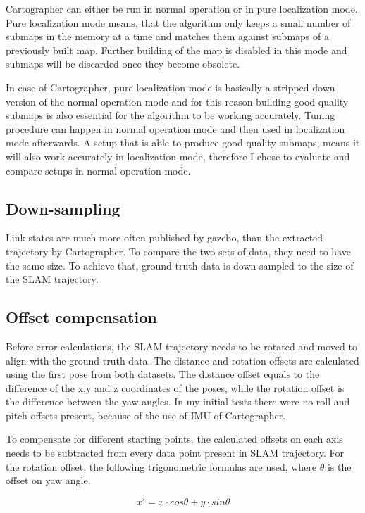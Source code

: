 Cartographer can either be run in normal operation or in pure localization mode. Pure localization
mode means, that the algorithm only keeps a small number of submaps in the memory at a time and 
matches them against submaps of a previously built map. Further building of the map is disabled 
in this mode and submaps will be discarded once they become obsolete. 

In case of Cartographer, pure localization mode is basically a stripped down version of the normal
operation mode and for this reason building good quality submaps is also essential for the algorithm to 
be working accurately. Tuning procedure can happen in normal operation mode and then used in 
localization mode afterwards. A setup that is able to produce good quality submaps, means it
will also work accurately in localization mode, therefore I chose to evaluate and compare setups
in normal operation mode. 

\subsection{Down-sampling}
Link states are much more often published by gazebo, than the extracted trajectory by Cartographer. 
To compare the two sets of data, they need to have the same size. To achieve that, ground truth
data is down-sampled to the size of the SLAM trajectory.

\subsection{Offset compensation}
Before error calculations, the SLAM trajectory needs to be rotated and moved to align with the
ground truth data. The distance and rotation offsets are calculated using the first pose from both
datasets. The distance offset equals to the difference of the x,y and z coordinates of the poses,
while the rotation offset is the difference between the yaw angles. In my initial tests there were 
no roll and pitch offsets present, because of the use of IMU of Cartographer. 

To compensate for different starting points, the calculated offsets on each axis needs to be 
subtracted from every data point present in SLAM trajectory. For the rotation offset, the 
following trigonometric formulas are used, where $\theta$ is the offset on yaw angle.

\begin{equation}\label{eq:rotation_x}
    x'=x\cdot cos\theta + y\cdot sin\theta    
\end{equation}

